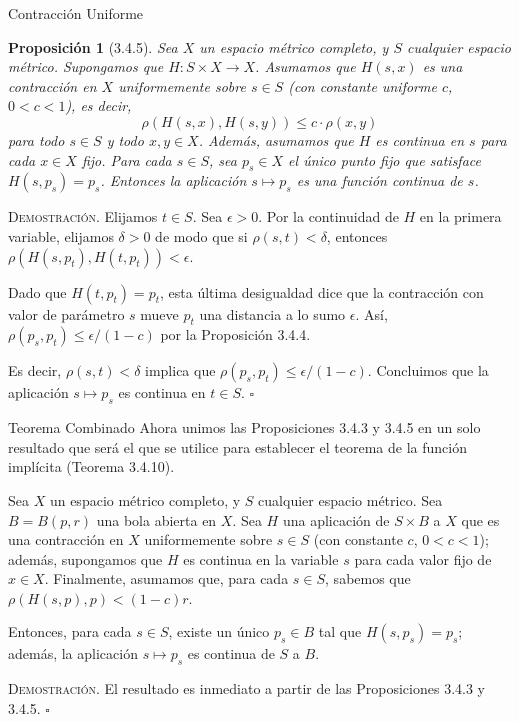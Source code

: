 \documentclass[10pt]{beamer}
\newtheorem{proposicion}{Proposición}
\begin{document}
	\begin{frame}[allowframebreaks]{Contracción Uniforme}
		\begin{proposicion}[3.4.5]
			Sea $X$ un espacio métrico completo, y $S$ cualquier espacio métrico. Supongamos que $H : S \times X \to X$. Asumamos que $H(s, x)$ es una contracción en $X$ uniformemente sobre $s \in S$ (con constante uniforme $c$, $0 < c < 1$), es decir,
			\[ \rho(H(s, x), H(s, y)) \leq c \cdot \rho(x, y) \]
			para todo $s \in S$ y todo $x, y \in X$. Además, asumamos que $H$ es continua en $s$ para cada $x \in X$ fijo. Para cada $s \in S$, sea $p_s \in X$ el único punto fijo que satisface $H(s, p_s) = p_s$. Entonces la aplicación $s \mapsto p_s$ es una función continua de $s$.
		\end{proposicion}
		
		\framebreak
		
		\textsc{Demostración.} Elijamos $t \in S$. Sea $\epsilon > 0$. Por la continuidad de $H$ en la primera variable, elijamos $\delta > 0$ de modo que si $\rho(s, t) < \delta$, entonces $\rho(H(s, p_t), H(t, p_t)) < \epsilon$. 
		
		Dado que $H(t, p_t) = p_t$, esta última desigualdad dice que la contracción con valor de parámetro $s$ mueve $p_t$ una distancia a lo sumo $\epsilon$. Así, $\rho(p_s, p_t) \leq \epsilon / (1 - c)$ por la Proposición 3.4.4. 
		
		Es decir, $\rho(s, t) < \delta$ implica que $\rho(p_s, p_t) \leq \epsilon / (1 - c)$. Concluimos que la aplicación $s \mapsto p_s$ es continua en $t \in S$. \hfill $\square$
	\end{frame}
	
	\begin{frame}[allowframebreaks]{Teorema Combinado}
		Ahora unimos las Proposiciones 3.4.3 y 3.4.5 en un solo resultado que será el que se utilice para establecer el teorema de la función implícita (Teorema 3.4.10). 
		
		\begin{theorem}[3.4.6]
			Sea $X$ un espacio métrico completo, y $S$ cualquier espacio métrico. Sea $B = B(p, r)$ una bola abierta en $X$. Sea $H$ una aplicación de $S \times B$ a $X$ que es una contracción en $X$ uniformemente sobre $s \in S$ (con constante $c$, $0 < c < 1$); además, supongamos que $H$ es continua en la variable $s$ para cada valor fijo de $x \in X$. Finalmente, asumamos que, para cada $s \in S$, sabemos que $\rho(H(s, p), p) < (1 - c)r$.
			
			Entonces, para cada $s \in S$, existe un único $p_s \in B$ tal que $H(s, p_s) = p_s$; además, la aplicación $s \mapsto p_s$ es continua de $S$ a $B$.
		\end{theorem}
		\textsc{Demostración.} El resultado es inmediato a partir de las Proposiciones 3.4.3 y 3.4.5. \hfill $\square$
	\end{frame}
	
\end{document}
